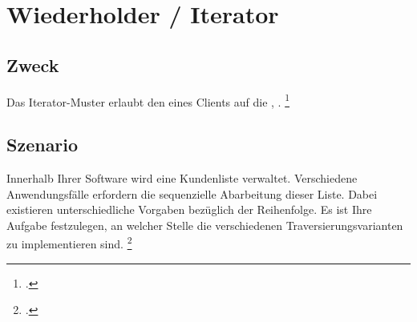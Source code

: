 \documentclass{lehramt-informatik-haupt}
\begin{document}

\chapter{Wiederholder / Iterator}

\begin{quellen}
\item \cite{wiki:iterator}
\item \cite[PDF Seite 219-231]{gof}
\item \cite[Seite 56-59]{eilebrecht}
\item \cite[Seite 106-116]{siebler}
\end{quellen}

%

\section{Zweck}

Das Iterator-Muster erlaubt den  eines
Clients auf die , .
\footcite[Seite 56]{eilebrecht}

%

\section{Szenario}

Innerhalb Ihrer Software wird eine Kundenliste verwaltet. Verschiedene
Anwendungsfälle erfordern die sequenzielle Abarbeitung dieser Liste.
Dabei existieren unterschiedliche Vorgaben bezüglich der Reihenfolge. Es
ist Ihre Aufgabe festzulegen, an welcher Stelle die verschiedenen
Traversierungsvarianten zu implementieren sind.
\footcite[Seite 56]{eilebrecht}

%
\end{document}
